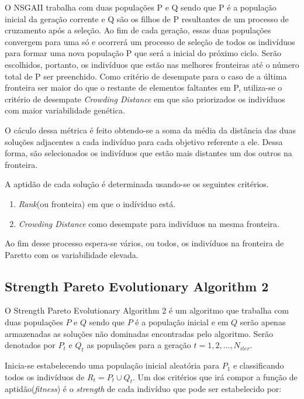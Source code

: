 \documentclass[]{article}
\begin{document}
    O NSGAII trabalha com duas populações P e Q sendo que P é a população inicial da geração corrente e Q são os filhos de P resultantes de um processo de cruzamento após a seleção. Ao fim de cada geração, essas duas populações convergem para uma só e ocorrerá um processo de seleção de todos os indivíduos para formar uma nova população P que será a inicial do próximo ciclo. Serão escolhidos, portanto, os indivíduos que estão nas melhores fronteiras até o número total de P ser preenchido. Como critério de desempate para o caso de a última fronteira ser maior do que o restante de elementos faltantes em P, utiliza-se o critério de desempate \textit{Crowding Distance} em que são priorizados os indivíduos com maior variabilidade genética.
    
    O cáculo dessa métrica é feito obtendo-se a soma da média da distância das duas soluções adjacentes a cada indivíduo para cada objetivo referente a ele. Dessa forma, são selecionados os indivíduos que estão mais distantes um dos outros na fronteira.
    
    A aptidão de cada solução é determinada usando-se os seguintes critérios.
    
    \begin{enumerate}
    \item \textit{Rank}(ou fronteira) em que o indíviduo está.
    \item \textit{Crowding Distance} como desempate para indivíduos na mesma fronteira.
    \end{enumerate}
  
   Ao fim desse processo espera-se vários, ou todos, os indivíduos na fronteira de Paretto com os variabilidade elevada.
 
\subsection{Strength Pareto Evolutionary Algorithm 2}
	O Strength Pareto Evolutionary Algorithm 2\cite{SPEA2} é um algoritmo que trabalha com duas populações $P$ e $Q$ sendo que $P$ é a população inicial e em $Q$ serão apenas armazenadas as soluções não dominadas encontradas pelo algoritmo. Serão denotados por $P_t$ e $Q_t$ as populações para a geração $t = 1, 2, ..., N_{iter}$.
    
    Inicia-se estabelecendo uma população inicial aleatória para $P_1$ e classificando todos os indivíduos de $R_t = P_t \cup Q_t$. Um dos critérios que irá compor a função de aptidão(\textit{fitness}) é o \textit{strength} de cada indivíduo que pode ser estabelecido por:
 
\end{document}
